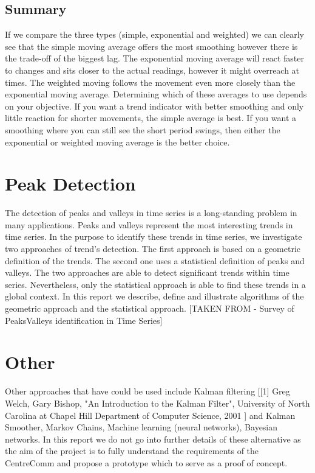 \subsection{Summary}
If we compare the three types (simple, exponential and weighted) we can clearly see that the simple moving average offers the most smoothing however there is the trade-off of the biggest lag.
The exponential moving average will react faster to changes and sits closer to the actual readings, however it might overreach at times.
The weighted moving follows the movement even more closely than the exponential moving average.
Determining which of these averages to use depends on your objective.  If you want a trend indicator with better smoothing and only little reaction for shorter movements, the simple average is best.
If you want a smoothing where you can still see the short period swings, then either the exponential or weighted moving average is the better choice.

\section{Peak Detection}
The detection of peaks and valleys in time series is a long-standing problem in many applications.
Peaks and valleys represent the most interesting trends in time series.
In the purpose to identify these trends in time series, we investigate two approaches of
trend's detection. The first approach is based on a geometric definition of the trends. The
second one uses a statistical definition of peaks and valleys. The two approaches are able to
detect significant trends within time series. Nevertheless, only the statistical approach is able
to find these trends in a global context.
In this report we describe, define and illustrate algorithms of the geometric approach and
the statistical approach. [TAKEN FROM - Survey of PeaksValleys identification in Time Series]

\section{Other}
Other approaches that have could be used include Kalman filtering [[1] Greg Welch, Gary Bishop, "An Introduction to the Kalman Filter",  University of North Carolina at Chapel Hill Department of Computer Science, 2001 ] and Kalman Smoother, Markov Chains,  Machine learning (neural networks), Bayesian networks. In this report we do not go into further details of these alternative as the aim of the project is to fully understand the requirements of the CentreComm and propose a prototype which to serve as a proof of concept.

